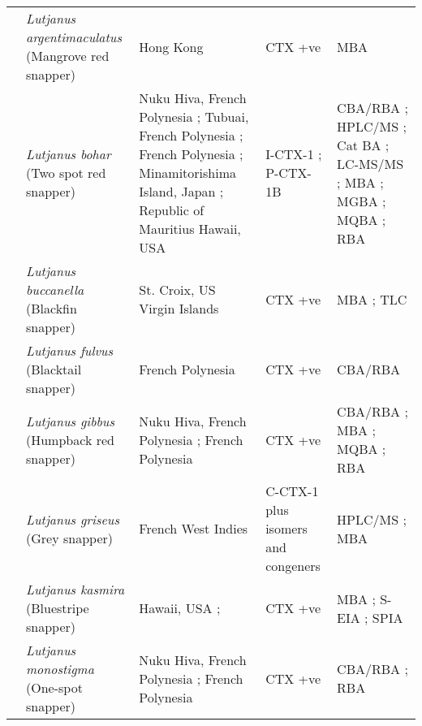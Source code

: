 \documentclass[12pt]{article}
\begin{document}
\begin{longtable}{  | p{2cm} | p{3cm} | p{4.5cm}  | p{2cm} | p{3cm}  | }
  & \emph{Lutjanus argentimaculatus} (Mangrove red snapper) & Hong Kong \cite{wong2008features} & CTX +ve \cite{wong2008features}  & MBA \cite{wong2008features} \\
  &  \emph{Lutjanus bohar} (Two spot red snapper) & Nuku Hiva, French Polynesia \cite{darius2007ciguatera}; Tubuai, French Polynesia \cite{darius2007ciguatera}; French Polynesia \cite{bagnis1987use,chinain2014mail}; Minamitorishima Island, Japan \cite{yogi2011detailed}; Republic of Mauritius \cite{hamilton2002multiple,hamilton2002isolation} Hawaii, USA \cite{hokama1990simplified} & I-CTX-1 \cite{hamilton2002multiple,hamilton2002isolation}; P-CTX-1B \cite{yogi2011detailed} & CBA/RBA \cite{chinain2014mail}; HPLC/MS \cite{hamilton2002multiple,hamilton2002isolation}; Cat BA \cite{bagnis1987use}; LC-MS/MS \cite{yogi2011detailed}; MBA \cite{hamilton2002multiple,bagnis1987use,hamilton2002isolation}; MGBA \cite{hamilton2002multiple,hamilton2002isolation}; MQBA \cite{bagnis1987use}; RBA  \cite{darius2007ciguatera} \\
  & \emph{Lutjanus buccanella} (Blackfin snapper)  & St. Croix, US Virgin Islands \cite{hoffman1983mouse} & CTX +ve \cite{hoffman1983mouse} & MBA \cite{hoffman1983mouse}; TLC \cite{hoffman1983mouse} \\
  & \emph{Lutjanus fulvus} (Blacktail snapper) & French Polynesia \cite{chinain2014mail} & CTX +ve \cite{chinain2014mail} & CBA/RBA \cite{chinain2014mail} \\
  & \emph{Lutjanus gibbus} (Humpback red snapper) & Nuku Hiva, French Polynesia \cite{darius2007ciguatera}; French Polynesia \cite{bagnis1987use,chinain2014mail}  & CTX +ve \cite{darius2007ciguatera,bagnis1987use,chinain2014mail} & CBA/RBA \cite{chinain2014mail}; MBA \cite{bagnis1987use}; MQBA \cite{bagnis1987use}; RBA \cite{darius2007ciguatera} \\
  &  \emph{Lutjanus griseus} (Grey snapper) & French West Indies \cite{pottier2002analysis} & C-CTX-1 plus isomers and congeners \cite{pottier2002analysis} & HPLC/MS \cite{pottier2002analysis}; MBA \cite{pottier2002analysis}\\
  & \emph{Lutjanus kasmira} (Bluestripe snapper) & Hawaii, USA \cite{hokama1993evaluation};& CTX +ve \cite{hokama1993evaluation}  &  MBA \cite{hokama1993evaluation}; S-EIA \cite{hokama1993evaluation}; SPIA \cite{hokama1993evaluation} \\
  & \emph{Lutjanus monostigma} (One-spot snapper)& Nuku Hiva, French Polynesia \cite{darius2007ciguatera}; French Polynesia \cite{chinain2014mail} & CTX +ve \cite{darius2007ciguatera,chinain2014mail}  & CBA/RBA \cite{chinain2014mail}; RBA \cite{darius2007ciguatera} \\

\end{longtable}
\end{document}
